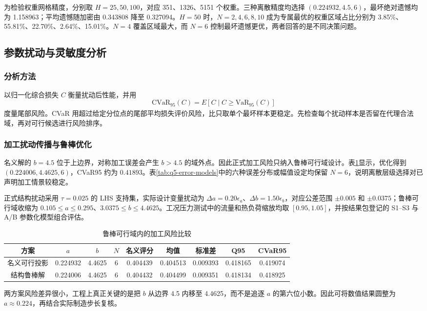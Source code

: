 \documentclass[12pt,a4paper]{article}
\newcommand{\upcite}[1]{\textsuperscript{\cite{#1}}}
\begin{document}
为检验权重网格精度，分别取 $H=25,50,100$，对应 351、1326、5151 个权重。三种离散精度均选择 $(0.224932,4.5,6)$，最坏绝对遗憾均为 1.158963；平均遗憾随加密由 0.343808 降至 0.327094。$H=50$ 时，$N=2,4,6,8,10$ 成为专属最优的权重区域占比分别为 3.85\%、55.81\%、22.70\%、2.64\%、15.01\%。$N=4$ 覆盖区域最大，而 $N=6$ 控制最坏遗憾更优，两者回答的是不同决策问题。

\subsection{参数扰动与灵敏度分析}
\subsubsection{分析方法}
以归一化综合损失 $C$ 衡量扰动后性能，并用
\begin{equation}\mathrm{CVaR}_{95}(C)=E\left[C\mid C\ge \mathrm{VaR}_{95}(C)\right]\end{equation}
度量尾部风险。CVaR 用超过给定分位点的尾部平均损失评价风险，比只取单个最坏样本更稳定\upcite{ref4,ref8}。先检查每个扰动样本是否留在代理合法域，再对可行候选进行风险排序。

\subsubsection{加工扰动传播与鲁棒优化}
名义解的 $b=4.5$ 位于上边界，对称加工误差会产生 $b>4.5$ 的域外点。因此正式加工风险只纳入鲁棒可行域设计。表\ref{tab:q5-risk}显示，优化得到 $(0.224006,4.4625,6)$，CVaR95 约为 $0.41893$。表\ref{tab:q5-error-models}中的六种误差分布或幅值设定均保留 $N=6$，说明离散层级选择对已声明加工情景较稳定。

正式结构扰动采用 $\tau=0.025$ 的 LHS 支持集，实际设计变量扰动为 $\Delta a=0.20\epsilon_a$、$\Delta b=1.50\epsilon_b$，对应公差范围 $\pm0.005$ 和 $\pm0.0375$；鲁棒可行域收缩为 $0.105\le a\le0.295$、$3.0375\le b\le4.4625$。工况压力测试中的流量和热负荷缩放均取 $[0.95,1.05]$，并按结果包登记的 S1--S3 与 A/B 参数化模型组合评估。

\begin{table}[H]\centering\small\setlength{\tabcolsep}{3.5pt}\caption{鲁棒可行域内的加工风险比较}\label{tab:q5-risk}
\begin{tabular}{ccccccccc}\toprule
方案&$a$&$b$&$N$&名义评分&均值&标准差&Q95&CVaR95\\\midrule
名义可行投影&0.224932&4.4625&6&0.404439&0.404513&0.009393&0.418165&0.419074\\
结构鲁棒解&0.224006&4.4625&6&0.404432&0.404499&0.009351&0.418134&0.418925\\\bottomrule
\end{tabular}\end{table}
两方案风险差异很小，工程上真正关键的是把 $b$ 从边界 4.5 内移至 4.4625，而不是追逐 $a$ 的第六位小数。因此可将数值结果圆整为 $a\approx0.224$，再结合实际制造步长复核。
\end{document}
